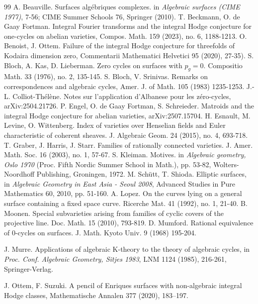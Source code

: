 \documentclass[10pt]{article}
\begin{document}
\begin{thebibliography}{99}
 A. Beauville. Surfaces alg\'{e}briques complexes. in {\it Algebraic surfaces (CIME 1977)}, 7-56; CIME Summer Schools 76, Springer (2010).
     T. Beckmann, O. de Gaay Fortman. Integral Fourier transforms and the integral Hodge
conjecture for one-cycles on abelian varieties, Compos.
Math. 159 (2023), no. 6, 1188-1213.
 O. Benoist, J. Ottem.  Failure of the integral Hodge conjecture for threefolds of Kodaira dimension zero, Commentarii Mathematici Helvetici 95 (2020), 27-35).
     S. Bloch, A. Kas, D. Lieberman. Zero cycles on surfaces with $p_g=0$. Compositio Math. 33 (1976), no. 2, 135-145.
     S. Bloch, V. Srinivas. Remarks on correspondences and algebraic cycles, Amer. J. of
Math. 105 (1983) 1235-1253.
 J.-L. Colliot-Th\'{e}l\`{e}ne. Notes sur l'application d'Albanese pour les z\'{e}ro-cycles, arXiv:2504.21726.
  P. Engel, O. de Gaay Fortman, S. Schreieder. Matroids and the integral Hodge conjecture for abelian varieties, arXiv:2507.15704.
 H. Esnault, M. Levine, O. Wittenberg.
Index of varieties over Henselian fields and Euler characteristic of coherent sheaves.
J. Algebraic Geom. 24 (2015), no. 4, 693-718.
  T. Graber, J. Harris, J. Starr. Families of rationally connected varieties. J. Amer.
Math. Soc. 16 (2003), no. 1, 57-67.
  S. Kleiman.
Motives. in {\it Algebraic geometry, Oslo 1970} (Proc. Fifth Nordic Summer School in Math.), pp. 53-82, Wolters-Noordhoff Publishing, Groningen, 1972.
   M. Schütt, T. Shioda. Elliptic surfaces, in {\it Algebraic Geometry in East Asia - Seoul 2008}, Advanced Studies in Pure Mathematics 60, 2010, pp. 51-160.
 A. Lopez. On the curves lying on a general surface containing a fixed space curve.
Ricerche Mat. 41 (1992), no. 1, 21-40.
   B. Moonen.  Special subvarieties arising from families of cyclic covers of the projective line. Doc. Math. 15 (2010), 793-819.
     D. Mumford. Rational equivalence of 0-cycles on surfaces. J. Math. Kyoto Univ. 9
(1968) 195-204.

     J. Murre. Applications of algebraic K-theory to the theory of algebraic cycles, in {\it Proc.
Conf. Algebraic Geometry, Sitjes 1983}, LNM 1124 (1985), 216-261, Springer-Verlag.


  J. Ottem, F. Suzuki.   A pencil of Enriques surfaces with non-algebraic integral Hodge classes,  Mathematische Annalen 377 (2020), 183–197.


\end{thebibliography}
\end{document}
